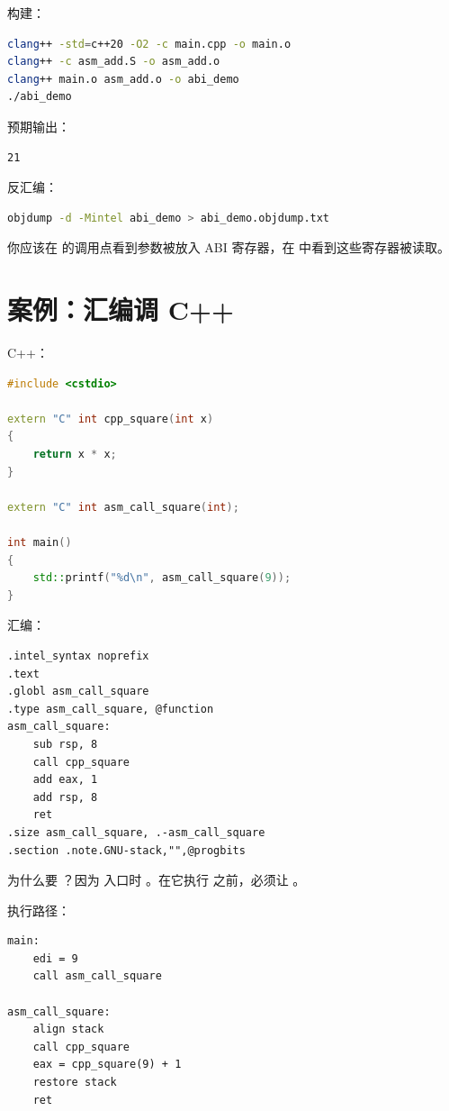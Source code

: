 构建：

\begin{lstlisting}[language=bash]
clang++ -std=c++20 -O2 -c main.cpp -o main.o
clang++ -c asm_add.S -o asm_add.o
clang++ main.o asm_add.o -o abi_demo
./abi_demo
\end{lstlisting}

预期输出：

\begin{lstlisting}
21
\end{lstlisting}

反汇编：

\begin{lstlisting}[language=bash]
objdump -d -Mintel abi_demo > abi_demo.objdump.txt
\end{lstlisting}

你应该在  的调用点看到参数被放入 ABI 寄存器，在  中看到这些寄存器被读取。

\section{案例：汇编调 C++}

C++：

\begin{lstlisting}[language=C++]
#include <cstdio>

extern "C" int cpp_square(int x)
{
    return x * x;
}

extern "C" int asm_call_square(int);

int main()
{
    std::printf("%d\n", asm_call_square(9));
}
\end{lstlisting}

汇编：

\begin{lstlisting}
.intel_syntax noprefix
.text
.globl asm_call_square
.type asm_call_square, @function
asm_call_square:
    sub rsp, 8
    call cpp_square
    add eax, 1
    add rsp, 8
    ret
.size asm_call_square, .-asm_call_square
.section .note.GNU-stack,"",@progbits
\end{lstlisting}

为什么要 ？因为  入口时 。在它执行   之前，必须让 。

执行路径：

\begin{lstlisting}
main:
    edi = 9
    call asm_call_square

asm_call_square:
    align stack
    call cpp_square
    eax = cpp_square(9) + 1
    restore stack
    ret
\end{lstlisting}

